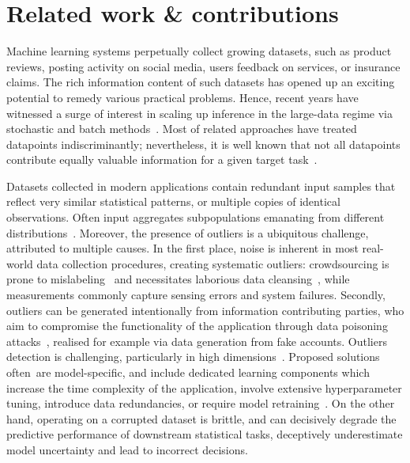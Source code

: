 \section{Related work \& contributions}
\label{sec:introduction}

Machine learning systems perpetually collect growing datasets, such as product reviews, posting activity on social media, users feedback on services, or insurance claims. The rich information content of such datasets has opened up an exciting potential to remedy various practical problems. Hence, recent years have witnessed a surge of interest in scaling up inference in the large-data regime via stochastic and batch methods~\cite{angelino16, hoffman13, welling11}. Most of related approaches have treated datapoints indiscriminantly; nevertheless, it is well known that not all datapoints contribute equally valuable information for a given target task~\cite{ghorbani19}. 

Datasets collected in modern applications contain redundant input samples that reflect very similar statistical patterns, or multiple copies of identical observations. Often input aggregates subpopulations emanating from different distributions~\cite{zheng08, zhuang15}. Moreover, the presence of outliers is a ubiquitous challenge, attributed to multiple causes. In the first place, noise is inherent in most real-world data collection procedures, creating systematic outliers: crowdsourcing is prone to mislabeling~\cite{frenay13} and necessitates laborious data cleansing~\cite{lewis04, paschou10}, while measurements commonly capture sensing errors and system failures. Secondly, outliers can be generated intentionally from information contributing parties, who aim to compromise the functionality of the application through data poisoning attacks~\cite{barreno10, biggio12, li16, koh17, steinhardt17, ghorbani19}, realised for example via data generation from fake accounts. Outliers detection is  challenging, particularly in high dimensions~\cite{lucic16outliers, diakonikolas19, dickens20}. Proposed solutions \mbox{often are} model-specific, and include dedicated learning components which increase the time complexity of the application, involve extensive hyperparameter tuning, introduce data redundancies, or require model retraining~\cite{sheng08, whitehill09, raykar10, karger11, liu12, zhang16}. On the other hand, operating on a corrupted dataset is brittle, and can decisively degrade the predictive performance of downstream statistical tasks, deceptively underestimate model uncertainty and lead to incorrect decisions. 


